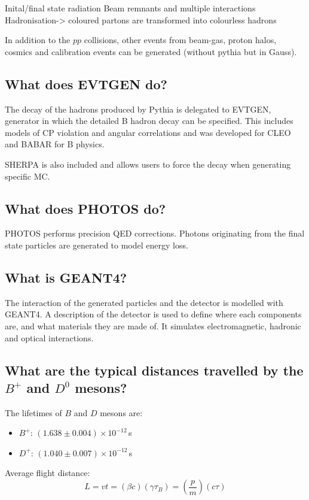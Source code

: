 \documentclass[12pt]{article}
\begin{document}
Inital/final state radiation
Beam remnants and multiple interactions
Hadronisation-> coloured partons are transformed into colourless hadrons

In addition to the $pp$ collisions, other events from beam-gas, proton halos, cosmics and calibration events can be generated (without pythia but in Gauss).

\subsection{What does EVTGEN do?}
The decay of the hadrons produced by Pythia is delegated to EVTGEN, generator in which the detailed B hadron decay can be specified. This includes models of CP violation and angular correlations and was developed for CLEO and BABAR for B physics.

SHERPA is also included and allows users to force the decay when generating specific MC.

\subsection{What does PHOTOS do?}
PHOTOS performs precision QED corrections. Photons originating from the final state particles are generated to model energy loss.

\subsection{What is GEANT4?}

The interaction of the generated particles and the detector is modelled with GEANT4. A description of the detector is used to define where each components are, and what materials they are made of. It simulates electromagnetic, hadronic and optical interactions.

\subsection{What are the typical distances travelled by the $B^{+}$ and $D^{0}$ mesons?}

The lifetimes of $B$ and $D$ mesons are:
\begin{itemize}
\item $B^{+}$: $(1.638\pm 0.004) \times 10^{-12}\,$s 
\item $D^{+}$: $(1.040\pm 0.007) \times 10^{-12}\,$s 
\end{itemize} 

Average flight distance:
\begin{equation}
L = v t = (\beta c) (\gamma \tau_{B}) = (\frac{p}{m}) (c\tau)
\end{equation}
\end{document}
